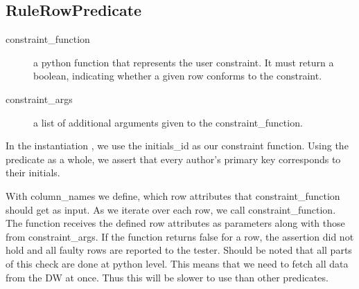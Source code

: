 \subsection{RuleRowPredicate}\label{RCP}


\begin{description}
\item [constraint\_function] a python function that represents the user constraint. It must return a boolean, indicating whether a given row conforms to the constraint.
\item [constraint\_args] a list of additional arguments given to the constraint\_function.
\end{description}

In the instantiation , we use the initials\_id as our constraint function. Using the predicate as a whole, we assert that every author's primary key corresponds to their initials.

With column\_names we define, which row attributes that constraint\_function should get as input. As we iterate over each row, we call constraint\_function. The function receives the defined row attributes as parameters along with those from constraint\_args. If the function returns false for a row, the assertion did not hold and all faulty rows are reported to the tester. Should be noted that all parts of this check are done at python level. This means that we need to fetch all data from the DW at once. Thus this will be slower to use than other predicates.

